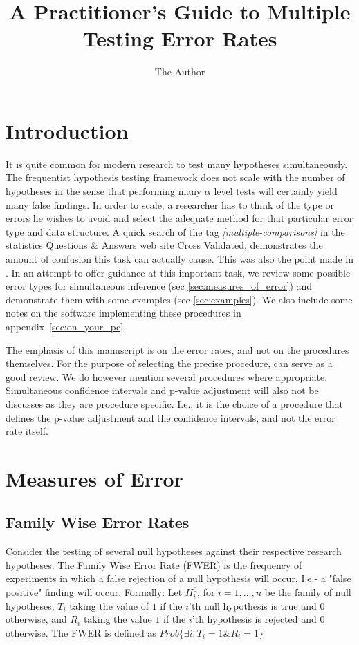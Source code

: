 \documentclass[draft,12pt]{article}
\title{A Practitioner's Guide to Multiple Testing Error Rates}
\author{The Author}
\date{}
\begin{document}
\maketitle


\section{Introduction}

It is quite common for modern research to test many hypotheses simultaneously. The frequentist hypothesis testing framework does not scale with the number of hypotheses in the sense that performing many $\alpha$ level tests will certainly yield many false findings. In order to scale, a researcher has to think of the type or errors he wishes to avoid and select the adequate method for that particular error type and data structure. A quick search of the tag \emph{[multiple-comparisons]} in the statistics Questions \& Answers web site \href{http://stats.stackexchange.com}{Cross Validated}, demonstrates the amount of confusion this task can actually cause. This was also the point made in \citep[see][section 4.4]{benjamini_simultaneous_2010}. 
In an attempt to offer guidance at this important task, we review some possible error types for simultaneous inference (sec \ref{sec:measures_of_error}) and demonstrate them with some examples (sec \ref{sec:examples}). We also include some notes on the software implementing these procedures in appendix~\ref{sec:on_your_pc}.

The emphasis of this manuscript is on the error rates, and not on the procedures themselves. For the purpose of selecting the precise procedure, \citet{farcomeni_review_2008} can serve as a good review. We do however mention several procedures where appropriate.  Simultaneous confidence intervals and p-value adjustment will also not be discusses as they are procedure specific. I.e., it is the choice of a procedure that defines the p-value adjustment and the confidence intervals, and not the error rate itself.


\section{\label{sec:measures_of_error}Measures of Error}

\subsection{Family Wise Error Rates}
Consider the testing of several null hypotheses against their respective research hypotheses. The Family Wise Error Rate (FWER) is the frequency of experiments in which a false rejection of a null hypothesis will occur. I.e.- a "false positive" finding will occur.
Formally: Let $H^0_i$, for $i=1,\ldots,n$ be the family of null hypotheses, $T_i$ taking the value of $1$ if the $i$'th null hypothesis is true and 0 otherwise,  and $R_i$ taking the value $1$ if the $i$'th hypothesis is rejected and 0 otherwise.
The FWER is defined as $Prob\{\exists i:T_i=1 \& R_i=1  \}$
\end{document}
